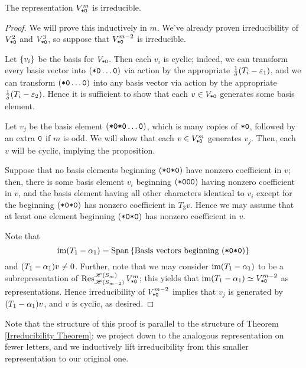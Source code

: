 \documentclass{amsart}
\begin{document}
\begin{proposition}\label{Fib irreducibility}
  The representation \emph{$V^m_{\texttt{*}\texttt{0}}$} is irreducible.
\end{proposition}
\begin{proof}
  We will prove this inductively in $m$.
  We've already proven irreducibility of $V^2_{\texttt{*}\texttt{0}}$ and $V^3_{\texttt{*}\texttt{0}}$, so suppose that $V^{m-2}_{\texttt{*}\texttt{0}}$ is irreducible.
  
  Let $\left\{ v_i \right\}$ be the basis for $V_{\texttt{*}\texttt{0}}$.
  Then each $v_i$ is cyclic; indeed, we can transform every basis vector into $(\texttt{*}\texttt{0} \dots \texttt{0})$ via action by the appropriate $\frac{1}{\delta}(T_i - \varepsilon_1)$, and we can transform $(\texttt{*}\texttt{0} \dots \texttt{0})$ into any basis vector via action by the appropriate $\frac{1}{\delta}(T_i - \varepsilon_2)$.
  Hence it is sufficient to show that each $v \in V_{\texttt{*}\texttt{0}}$ generates some basis element.

  Let $v_j$ be the basis element $(\texttt{*}\texttt{0}\texttt{*}\texttt{0}\dots \texttt{0})$, which is many copies of $\texttt{*}\texttt{0}$, followed by an extra $\texttt{0}$ if $m$ is odd.
  We will show that each $v \in V^m_{\texttt{*}\texttt{0}}$ generates $v_j$.
  Then, each $v$ will be cyclic, implying the proposition.

  Suppose that no basis elements beginning $(\texttt{*}\texttt{0}\texttt{*}\texttt{0})$ have nonzero coefficient in $v$;
  then, there is some basis element $v_i$ beginning $(\texttt{*}\texttt{0}\texttt{0}\texttt{0})$ having nonzero coefficient in $v$, and the basis element having all other characters identical to $v_i$ except for the beginning $(\texttt{*}\texttt{0}\texttt{*}\texttt{0})$ has nonzero coefficient in $T_3v$.
  Hence we may assume that at least one element beginning $(\texttt{*}\texttt{0}\texttt{*}\texttt{0})$ has nonzero coefficient in $v$.

  Note that \[\operatorname{im} (T_1 - \alpha_1) = \operatorname{Span}\left\{ \text{Basis vectors beginning }(\texttt{*}\texttt{0}\texttt{*}\texttt{0}) \right\}\] and $(T_1 - \alpha_1)v \neq 0$.
  Further, note that we may consider $\operatorname{im} (T_1 - \alpha_1)$ to be a subrepresentation of $\operatorname{Res}_{\mathscr{H}(S_{m-2})}^{\mathscr{H}(S_m)} V^m_{\texttt{*}\texttt{0}}$;
  this yields that $\operatorname{im} (T_1 - \alpha_1) \simeq V^{m-2}_{\texttt{*}\texttt{0}}$ as representations.
  Hence irreducibility of $V^{m-2}_{\texttt{*}\texttt{0}}$ implies that $v_j$ is generated by $(T_1 - \alpha_1)v$, and $v$ is cyclic, as desired.
\end{proof}

Note that the structure of this proof is parallel to the structure of Theorem \ref{Irreducibility Theorem}:
we project down to the analogous representation on fewer letters, and we inductively lift irreducibility from this smaller representation to our original one.
\end{document}
